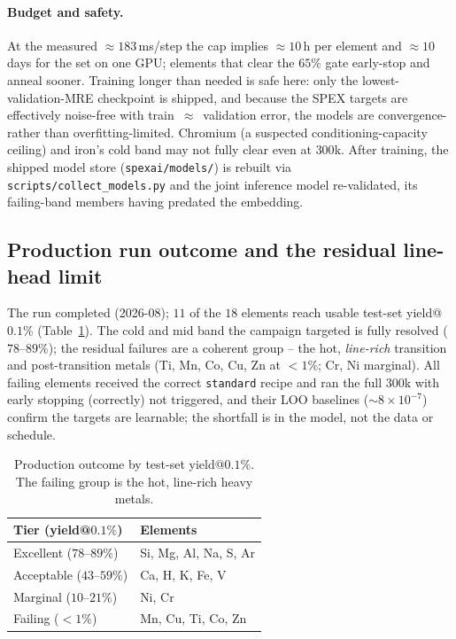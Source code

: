 \documentclass[11pt,a4paper]{article}
\newcommand{\code}[1]{\texttt{#1}}
\begin{document}
\paragraph{Budget and safety.} At the measured $\approx 183$\,ms/step the
cap implies $\approx 10$\,h per element and $\approx 10$ days for the set on
one GPU; elements that clear the $65\%$ gate early-stop and anneal sooner.
Training longer than needed is safe here: only the lowest-validation-MRE
checkpoint is shipped, and because the SPEX targets are effectively
noise-free with train~$\approx$~validation error, the models are
convergence- rather than overfitting-limited. Chromium (a suspected
conditioning-capacity ceiling) and iron's cold band may not fully clear even
at $300$k. After training, the shipped model store (\code{spexai/models/})
is rebuilt via \code{scripts/collect\_models.py} and the joint inference
model re-validated, its failing-band members having predated the embedding.

\subsection{Production run outcome and the residual line-head limit}
\label{sec:production_outcome}

The run completed (2026-08); $11$ of the $18$ elements reach usable
test-set yield@$0.1\%$ (Table~\ref{tab:production_outcome}). The cold and
mid band the campaign targeted is fully resolved ($78$--$89\%$); the
residual failures are a coherent group -- the hot, \emph{line-rich}
transition and post-transition metals (Ti, Mn, Co, Cu, Zn at $<1\%$; Cr,
Ni marginal). All failing elements received the correct \code{standard}
recipe and ran the full $300$k with early stopping (correctly) not
triggered, and their LOO baselines ($\sim$$8\times10^{-7}$) confirm the
targets are learnable; the shortfall is in the model, not the data or
schedule.

\begin{table}[t]
\centering
\caption{Production outcome by test-set yield@$0.1\%$. The failing group is
the hot, line-rich heavy metals.}
\label{tab:production_outcome}
\begin{tabular}{ll}
\hline
Tier (yield@$0.1\%$) & Elements \\
\hline
Excellent ($78$--$89\%$) & Si, Mg, Al, Na, S, Ar \\
Acceptable ($43$--$59\%$) & Ca, H, K, Fe, V \\
Marginal ($10$--$21\%$) & Ni, Cr \\
Failing ($<1\%$) & Mn, Cu, Ti, Co, Zn \\
\hline
\end{tabular}
\end{table}
\end{document}
